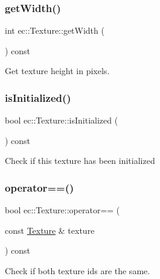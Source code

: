 \mbox{\label{classec_1_1_texture_a0c01b293f7fe1b9ee863a1a2e9b64a6f}} 
\subsubsection{\texorpdfstring{get\+Width()}{getWidth()}}
{\footnotesize\ttfamily int ec\+::\+Texture\+::get\+Width (\begin{DoxyParamCaption}{ }\end{DoxyParamCaption}) const}

Get texture height in pixels. \mbox{\label{classec_1_1_texture_ab81c62fde2f54dfbb5895a421224fcd9}} 
\subsubsection{\texorpdfstring{is\+Initialized()}{isInitialized()}}
{\footnotesize\ttfamily bool ec\+::\+Texture\+::is\+Initialized (\begin{DoxyParamCaption}{ }\end{DoxyParamCaption}) const}

Check if this texture has been initialized \mbox{\label{classec_1_1_texture_ab00e335380881f3267732186381c777c}} 
\subsubsection{\texorpdfstring{operator==()}{operator==()}}
{\footnotesize\ttfamily bool ec\+::\+Texture\+::operator== (\begin{DoxyParamCaption}\item[{const \mbox{\hyperlink{classec_1_1_texture}{Texture}} \&}]{texture }\end{DoxyParamCaption}) const}

Check if both texture ids are the same. \mbox{\label{classec_1_1_texture_af3555f8dda9a13babcb96d40d4417813}} 
